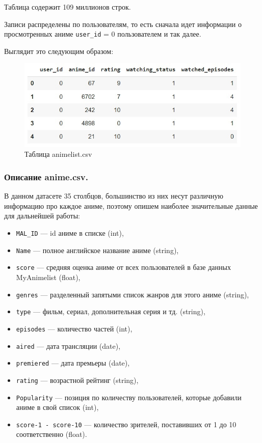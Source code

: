 \documentclass[bachelor, och, diploma]{SCWorks}
\begin{document}
Таблица содержит 109 миллионов строк.

Записи распределены по пользователям, то есть сначала идет информации о
 просмотренных аниме \verb|user_id| = 0 пользователем и так далее. 

 Выглядит это следующим образом:
 \begin{figure}[h]

	\centering
	
	\includegraphics[width=0.8\linewidth]{disc1.png}
	
	\caption{Таблица animelist.csv}
	
	\label{fig:d1}
	
\end{figure}
 \subsubsection{Описание anime.csv.}
 В данном датасете 35 столбцов, большинство из них несут различную информацию про каждое аниме, поэтому опишем наиболее значительные данные для дальнейшей работы:
 \begin{itemize}
	\item \verb|MAL_ID| --- id аниме в списке (int),
	\item \verb|Name| --- полное английское название аниме (string),
	\item \verb|score| --- средняя оценка аниме от всех пользователей в базе данных MyAnimelist (float),
	\item \verb|genres| --- разделенный запятыми список жанров для этого аниме (string),
	\item \verb|type| --- фильм, сериал, дополнительная серия и тд. (string),
	\item \verb|episodes| --- количество частей (int),
	\item \verb|aired| --- дата трансляции (date),
	\item \verb|premiered| --- дата премьеры (date),
	\item \verb|rating| --- возрастной рейтинг (string),
	\item \verb|Popularity| --- позиция по количеству пользователей, которые добавили аниме в свой список (int),
	\item \verb|score-1 - score-10| --- количество зрителей, поставивших от 1 до 10 соответственно (float).
\end{itemize}
\end{document}
